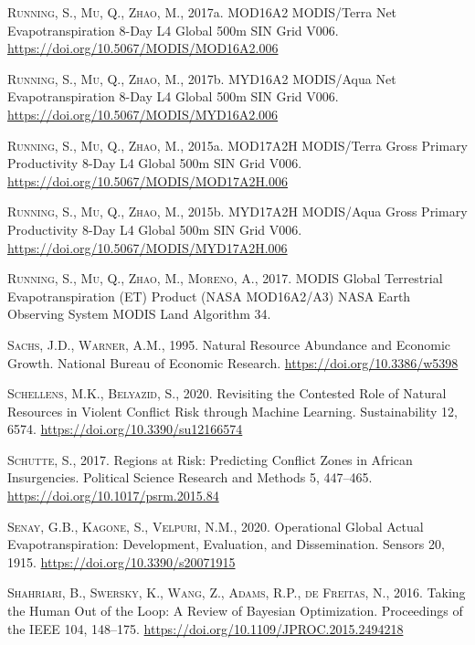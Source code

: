 \documentclass[a4paper,11pt]{article}
\begin{document}
\leavevmode\hypertarget{ref-runningsteve2017}{}%
\textsc{Running, S., Mu, Q., Zhao, M.}, 2017a. MOD16A2 MODIS/Terra Net Evapotranspiration 8-Day L4 Global 500m SIN Grid V006. \url{https://doi.org/10.5067/MODIS/MOD16A2.006}

\leavevmode\hypertarget{ref-runningsteve2017a}{}%
\textsc{Running, S., Mu, Q., Zhao, M.}, 2017b. MYD16A2 MODIS/Aqua Net Evapotranspiration 8-Day L4 Global 500m SIN Grid V006. \url{https://doi.org/10.5067/MODIS/MYD16A2.006}

\leavevmode\hypertarget{ref-runningsteve2015}{}%
\textsc{Running, S., Mu, Q., Zhao, M.}, 2015a. MOD17A2H MODIS/Terra Gross Primary Productivity 8-Day L4 Global 500m SIN Grid V006. \url{https://doi.org/10.5067/MODIS/MOD17A2H.006}

\leavevmode\hypertarget{ref-runningsteve2015a}{}%
\textsc{Running, S., Mu, Q., Zhao, M.}, 2015b. MYD17A2H MODIS/Aqua Gross Primary Productivity 8-Day L4 Global 500m SIN Grid V006. \url{https://doi.org/10.5067/MODIS/MYD17A2H.006}

\leavevmode\hypertarget{ref-running2017}{}%
\textsc{Running, S., Mu, Q., Zhao, M., Moreno, A.}, 2017. MODIS Global Terrestrial Evapotranspiration (ET) Product (NASA MOD16A2/A3) NASA Earth Observing System MODIS Land Algorithm 34.

\leavevmode\hypertarget{ref-sachs1995}{}%
\textsc{Sachs, J.D., Warner, A.M.}, 1995. Natural Resource Abundance and Economic Growth. National Bureau of Economic Research. \url{https://doi.org/10.3386/w5398}

\leavevmode\hypertarget{ref-schellens2020}{}%
\textsc{Schellens, M.K., Belyazid, S.}, 2020. Revisiting the Contested Role of Natural Resources in Violent Conflict Risk through Machine Learning. Sustainability 12, 6574. \url{https://doi.org/10.3390/su12166574}

\leavevmode\hypertarget{ref-schutte2017}{}%
\textsc{Schutte, S.}, 2017. Regions at Risk: Predicting Conflict Zones in African Insurgencies. Political Science Research and Methods 5, 447--465. \url{https://doi.org/10.1017/psrm.2015.84}

\leavevmode\hypertarget{ref-senay2020}{}%
\textsc{Senay, G.B., Kagone, S., Velpuri, N.M.}, 2020. Operational Global Actual Evapotranspiration: Development, Evaluation, and Dissemination. Sensors 20, 1915. \url{https://doi.org/10.3390/s20071915}

\leavevmode\hypertarget{ref-shahriari2016}{}%
\textsc{Shahriari, B., Swersky, K., Wang, Z., Adams, R.P., de Freitas, N.}, 2016. Taking the Human Out of the Loop: A Review of Bayesian Optimization. Proceedings of the IEEE 104, 148--175. \url{https://doi.org/10.1109/JPROC.2015.2494218}
\end{document}
